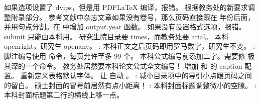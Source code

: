 \markdownRendererUlEnd \markdownRendererInterblockSeparator
{}\markdownRendererInterblockSeparator
{}\markdownRendererInterblockSeparator
{}\markdownRendererUlBegin
\markdownRendererUlItem 如果选项设置了 dvips，但是用 PDFLaTeX 编译，报错。\markdownRendererUlItemEnd 
\markdownRendererUlItem 根据教务处的新要求调整附录部分。\markdownRendererUlItemEnd 
\markdownRendererUlItem 参考文献中杂志文章如果没有卷号，那么页码直接跟在 年份后面，并用句点分割。在  中增加 output.year 函数。\markdownRendererUlItemEnd 
\markdownRendererUlItem 如果没有设置格式选项，报错。\markdownRendererUlItemEnd 
\markdownRendererUlItem submit 只能由本科用。\markdownRendererUlItemEnd 
\markdownRendererUlItem 研究生院目录要 times，而教务处要 arial。\markdownRendererUlItemEnd 
\markdownRendererUlItem 本科 openright，研究生 openany。\markdownRendererUlItemEnd 
\markdownRendererUlItem {}: 本科正文之后页码即用罗马数字，研究生不变。\markdownRendererUlItemEnd 
\markdownRendererUlItem {}: 脚注编号使用  命令，每页允许至多 99 个。\markdownRendererUlItemEnd 
\markdownRendererUlItem 本科公式编号前添加二字。需要修  极其深的一个命令。\markdownRendererUlItemEnd 
\markdownRendererUlItem 教务处居然要本科论文公式全文编号！\markdownRendererUlItemEnd 
\markdownRendererUlItem 增加  和  的 caption 配置。\markdownRendererUlItemEnd 
\markdownRendererUlItem 重新定义表格默认字体。\markdownRendererUlItemEnd 
\markdownRendererUlItem 让  自动 。\markdownRendererUlItemEnd 
\markdownRendererUlItem {}: 减小目录项中的导引小点跟页码之间的留白。\markdownRendererUlItemEnd 
\markdownRendererUlItem 硕士封面的冒号前居然有点小距离！\markdownRendererUlItemEnd 
\markdownRendererUlItem {}: 本科封面标题调整微小的空隙。\markdownRendererUlItemEnd 
\markdownRendererUlItem {}: 本科封面标题第二行的横线上移一点。\markdownRendererUlItemEnd 
